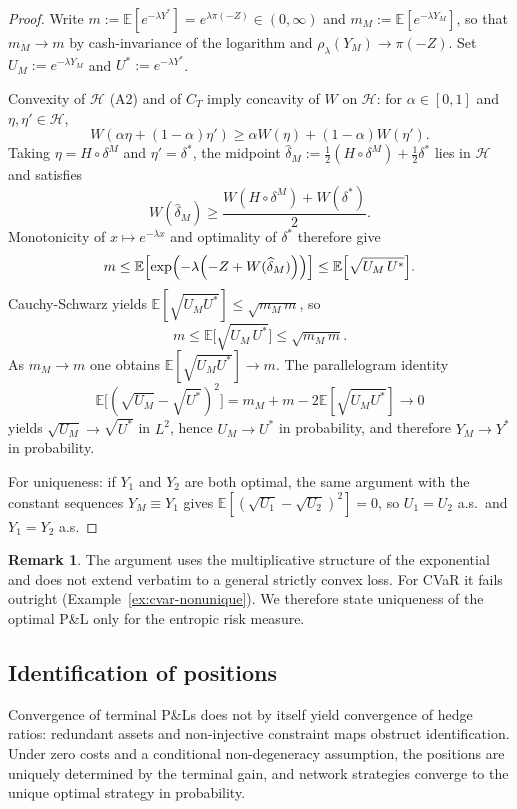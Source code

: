 \documentclass[11pt,a4paper]{report}
\numberwithin{equation}{chapter}
\theoremstyle{plain}
\theoremstyle{definition}
\newtheorem{remark}[proposition]{Remark}
\newcommand{\E}{\mathbb{E}}
\newcommand{\HH}{\mathcal{H}}
\begin{document}
\begin{proof}
    Write $m:=\E[e^{-\lambda Y^*}]=e^{\lambda\pi(-Z)}\in(0,\infty)$ and $m_M:=\E[e^{-\lambda Y_M}]$, so that $m_M\to m$ by cash-invariance of the logarithm and $\rho_\lambda(Y_M)\to\pi(-Z)$. Set $U_M:=e^{-\lambda Y_M}$ and $U^*:=e^{-\lambda Y^*}$.

    Convexity of $\HH$ (A2) and of $C_T$ imply concavity of $W$ on $\HH$: for $\alpha\in[0,1]$ and $\eta,\eta'\in\HH$,
    \[
        W(\alpha\eta+(1-\alpha)\eta')\ge\alpha W(\eta)+(1-\alpha)W(\eta').
    \]
    Taking $\eta=H\circ\delta^M$ and $\eta'=\delta^*$, the midpoint $\widehat\delta_M:=\frac12(H\circ\delta^M)+\frac12\delta^*$ lies in $\HH$ and satisfies
    \[
        W(\widehat\delta_M)\ge\frac{W(H\circ\delta^M)+W(\delta^*)}{2}.
    \]
    Monotonicity of $x\mapsto e^{-\lambda x}$ and optimality of $\delta^*$ therefore give
    \[
        m\le\E\Bigl[\exp\Bigl(-\lambda\Bigl(-Z+W(\widehat\delta_M)\Bigr)\Bigr)\Bigr]
        \le\E\Bigl[\sqrt{U_M\,U^*}\Bigr].
    \]
    Cauchy-Schwarz yields $\E[\sqrt{U_M U^*}]\le\sqrt{m_M\,m}$, so
    \[
        m\le\E\bigl[\sqrt{U_M\,U^*}\bigr]\le\sqrt{m_M\,m}.
    \]
    As $m_M\to m$ one obtains $\E[\sqrt{U_M U^*}]\to m$. The parallelogram identity
    \[
        \E\bigl[(\sqrt{U_M}-\sqrt{U^*})^2\bigr]=m_M+m-2\E[\sqrt{U_M U^*}]\longrightarrow0
    \]
    yields $\sqrt{U_M}\to\sqrt{U^*}$ in $L^2$, hence $U_M\to U^*$ in probability, and therefore $Y_M\to Y^*$ in probability.

    For uniqueness: if $Y_1$ and $Y_2$ are both optimal, the same argument with the constant sequences $Y_M\equiv Y_1$ gives $\E[(\sqrt{U_1}-\sqrt{U_2})^2]=0$, so $U_1=U_2$ a.s.\ and $Y_1=Y_2$ a.s.
\end{proof}

\begin{remark}
    The argument uses the multiplicative structure of the exponential and does not extend verbatim to a general strictly convex loss. For CVaR it fails outright (Example~\ref{ex:cvar-nonunique}). We therefore state uniqueness of the optimal P\&L only for the entropic risk measure.
\end{remark}

\subsection*{Identification of positions}

Convergence of terminal P\&Ls does not by itself yield convergence of hedge ratios: redundant assets and non-injective constraint maps obstruct identification. Under zero costs and a conditional non-degeneracy assumption, the positions are uniquely determined by the terminal gain, and network strategies converge to the unique optimal strategy in probability.
\end{document}
